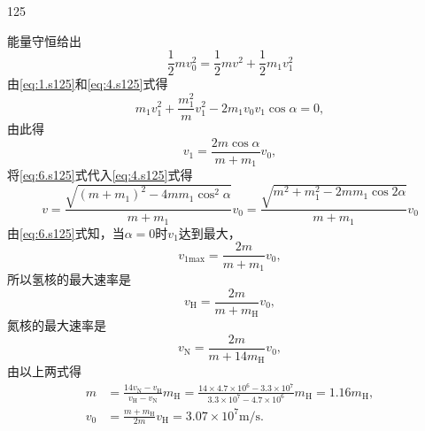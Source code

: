 \begin{solution}{125}
\begin{subsolution}
        能量守恒给出
        \begin{equation}
            \frac {1}{2} m v _ {0} ^ {2} = \frac {1}{2} m v ^ {2} + \frac {1}{2} m _ {1} v _ {1} ^ {2}
            \label{eq:4.s125}
        \end{equation}
        由\eqref{eq:1.s125}和\eqref{eq:4.s125}式得
        \begin{equation}
            m _ {1} v _ {1} ^ {2} + \frac {m _ {1} ^ {2}}{m} v _ {1} ^ {2} - 2 m _ {1} v _ {0} v _ {1} \cos \alpha = 0,
            \label{eq:5.s125}
        \end{equation}
        由此得
        \begin{equation}
            v _ {1} = \frac {2 m \cos \alpha}{m + m _ {1}} v _ {0},
            \label{eq:6.s125}
        \end{equation}
        将\eqref{eq:6.s125}式代入\eqref{eq:4.s125}式得
        \begin{equation}
            v = \frac {\sqrt {(m + m _ {1}) ^ {2} - 4 m m _ {1} \cos^ {2} \alpha}}{m + m _ {1}} v _ {0} = \frac {\sqrt {m ^ {2} + m _ {1} ^ {2} - 2 m m _ {1} \cos 2 \alpha}}{m + m _ {1}} v _ {0}
            \label{eq:7.s125}
        \end{equation}
        由\eqref{eq:6.s125}式知，当$\alpha = 0$时$v _ { 1 }$达到最大，
        \begin{equation}
            v _ {1 \mathrm{max}} = \frac {2 m}{m + m _ {1}} v _ {0},
            \label{eq:8.s125}
        \end{equation}
        所以氢核的最大速率是
        \begin{equation}
            v _ {\mathrm{H}} = \frac {2 m}{m + m _ {\mathrm{H}}} v _ {0},
            \label{eq:9.s125}
        \end{equation}
        氮核的最大速率是
        \begin{equation}
            v _ {\mathrm{N}} = \frac {2 m}{m + 14 m _ {\mathrm{H}}} v _ {0},
            \label{eq:10.s125}
        \end{equation}
        由以上两式得
        \begin{align}
            m &= \frac {14 v _ {\mathrm{N}} - v _ {\mathrm{H}}}{v _ {\mathrm{H}} - v _ {\mathrm{N}}} m _ {\mathrm{H}} = \frac {14 \times 4.7 \times 10^{6} - 3.3 \times 10^{7}}{3.3 \times 10^{7} - 4.7 \times 10^{6}} m _ {\mathrm{H}} = 1.16 m _ {\mathrm{H}}, \label{eq:11.s125} \\
            v _ {0} &= \frac {m + m _ {\mathrm{H}}}{2 m} v _ {\mathrm{H}} = 3.07 \times 10^{7} \mathrm{m/s}. \label{eq:12.s125}

\end{align}
\end{subsolution}
\end{solution}
